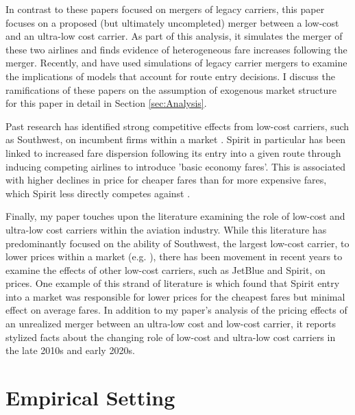 \documentclass{article}
\begin{document}
    In contrast to these papers focused on mergers of legacy carriers, this paper focuses on a proposed (but ultimately uncompleted) merger between a low-cost and an ultra-low cost carrier. As part of this analysis, it simulates the merger of these two airlines and finds evidence of heterogeneous fare increases following the merger. Recently, \citet{ciliberto_market_2021} and \citet{li_repositioning_2022} have used simulations of legacy carrier mergers to examine the implications of models that account for route entry decisions. I discuss the ramifications of these papers on the assumption of exogenous market structure for this paper in detail in Section \ref{sec:Analysis}. 

    Past research has identified strong competitive effects from low-cost carriers, such as Southwest, on incumbent firms within a market \citep{morrison_actual_2001, goolsbee_how_2008}. Spirit in particular has been linked to increased fare dispersion following its entry into a given route through inducing competing airlines to introduce 'basic economy fares'. This is associated with higher declines in price for cheaper fares than for more expensive fares, which Spirit less directly competes against \citep{shrago_spirit_2024}.

    
	Finally, my paper touches upon the literature examining the role of low-cost and ultra-low cost carriers within the aviation industry. While this literature has predominantly focused on the ability of Southwest, the largest low-cost carrier, to lower prices within a market (e.g. \citet{windle_short_1995, morrison_actual_2001,  goolsbee_how_2008}), there has been movement in recent years to examine the effects of other low-cost carriers, such as JetBlue and Spirit, on prices. One example of this strand of literature is \citet{shrago_spirit_2024} which found that Spirit entry into a market was responsible for lower prices for the cheapest fares but minimal effect on average fares. In addition to my paper's analysis of the pricing effects of an unrealized merger between an ultra-low cost and low-cost carrier, it reports stylized facts about the changing role of low-cost and ultra-low cost carriers in the late 2010s and early 2020s.  
	
	\section{Empirical Setting}
	\label{sec:Setting}
	
\end{document}
